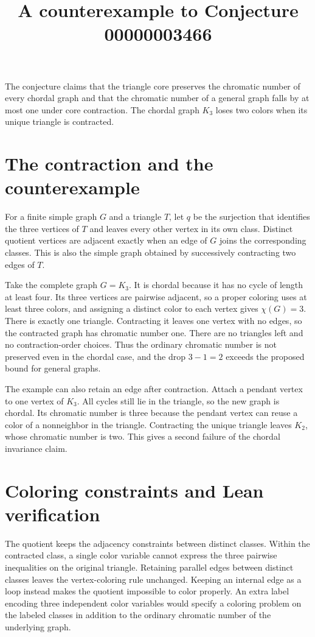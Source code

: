 \documentclass[11pt]{article}
\title{A counterexample to Conjecture 00000003466}
\author{}
\date{}
\begin{document}
\maketitle

\noindent
The conjecture claims that the triangle core preserves the chromatic number
of every chordal graph and that the chromatic number of a general graph falls
by at most one under core contraction. The chordal graph $K_3$ loses two
colors when its unique triangle is contracted.

\section*{The contraction and the counterexample}

For a finite simple graph $G$ and a triangle $T$, let $q$ be the surjection
that identifies the three vertices of $T$ and leaves every other vertex in
its own class. Distinct quotient vertices are adjacent exactly when an edge
of $G$ joins the corresponding classes. This is also the simple graph
obtained by successively contracting two edges of $T$.

Take the complete graph $G=K_3$. It is chordal because it has no cycle of
length at least four. Its three vertices are pairwise adjacent, so a proper
coloring uses at least three colors, and assigning a distinct color to each
vertex gives $\chi(G)=3$. There is exactly one triangle. Contracting it leaves
one vertex with no edges, so the contracted graph has chromatic number one.
There are no triangles left and no contraction-order choices. Thus the
ordinary chromatic number is not preserved even in the chordal case, and
the drop $3-1=2$ exceeds the proposed bound for general graphs.

The example can also retain an edge after contraction. Attach a pendant
vertex to one vertex of $K_3$. All cycles still lie in the triangle, so the
new graph is chordal. Its chromatic number is three because the pendant
vertex can reuse a color of a nonneighbor in the triangle. Contracting the
unique triangle leaves $K_2$, whose chromatic number is two. This gives a
second failure of the chordal invariance claim.

\section*{Coloring constraints and Lean verification}

The quotient keeps the adjacency constraints between distinct classes.
Within the contracted class, a single color variable cannot express the
three pairwise inequalities on the original triangle. Retaining parallel
edges between distinct classes leaves the vertex-coloring rule unchanged.
Keeping an internal edge as a loop instead makes the quotient impossible to
color properly. An extra label encoding three independent color variables
would specify a coloring problem on the labeled classes in addition to the
ordinary chromatic number of the underlying graph.
\end{document}
